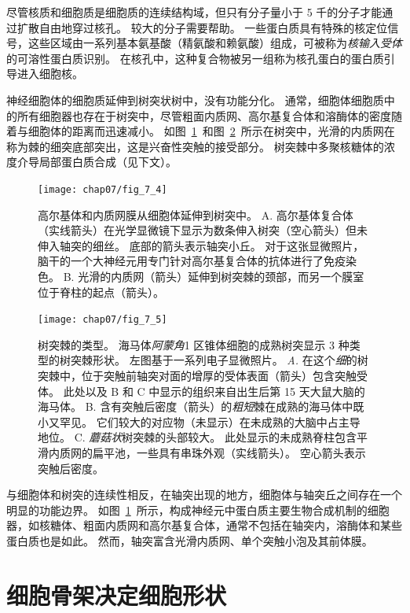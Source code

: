 尽管核质和细胞质是细胞质的连续结构域，但只有分子量小于 5 千的分子才能通过扩散自由地穿过核孔。
较大的分子需要帮助。
一些蛋白质具有特殊的核定位信号，这些区域由一系列基本氨基酸（精氨酸和赖氨酸）组成，可被称为\textit{核输入受体}的可溶性蛋白质识别。
在核孔中，这种复合物被另一组称为核孔蛋白的蛋白质引导进入细胞核。


神经细胞体的细胞质延伸到树突状树中，没有功能分化。 
通常，细胞体细胞质中的所有细胞器也存在于树突中，尽管粗面内质网、高尔基复合体和溶酶体的密度随着与细胞体的距离而迅速减小。 
如图~\ref{fig:7_4}~和图~\ref{fig:7_5}~所示在树突中，光滑的内质网在称为棘的细突底部突出，这是兴奋性突触的接受部分。
树突棘中多聚核糖体的浓度介导局部蛋白质合成（见下文）。


\begin{figure}[htbp]
	\centering
	\texttt{[image: chap07/fig\_7\_4]}
	\caption{高尔基体和内质网膜从细胞体延伸到树突中。
		A. 高尔基体复合体（实线箭头）在光学显微镜下显示为数条伸入树突（空心箭头）但未伸入轴突的细丝。
		底部的箭头表示轴突小丘。
		对于这张显微照片，脑干的一个大神经元用专门针对高尔基复合体的抗体进行了免疫染色\cite{de1986heterogeneous}。
		B. 光滑的内质网（箭头）延伸到树突棘的颈部，而另一个膜室位于脊柱的起点（箭头）\cite{cooney2002endosomal}。}
	\label{fig:7_4}
\end{figure}


\begin{figure}[htbp]
	\centering
	\texttt{[image: chap07/fig\_7\_5]}
	\caption{树突棘的类型。
		海马体\textit{阿蒙角}1 区锥体细胞的成熟树突显示 3 种类型的树突棘形状。
		左图基于一系列电子显微照片\cite{harris1989dendritic,sorra1993occurrence}。
		\textit{A.} 在这个\textit{细}的树突棘中，位于突触前轴突对面的增厚的受体表面（箭头）包含突触受体。
		此处以及 B 和 C 中显示的组织来自出生后第 15 天大鼠大脑的海马体。
		B. 含有突触后密度（箭头）的\textit{粗短}棘在成熟的海马体中既小又罕见。
		它们较大的对应物（未显示）在未成熟的大脑中占主导地位。
		C. \textit{蘑菇状}树突棘的头部较大。
		此处显示的未成熟脊柱包含平滑内质网的扁平池，一些具有串珠外观（实线箭头）。
		空心箭头表示突触后密度。}
	\label{fig:7_5}
\end{figure}


与细胞体和树突的连续性相反，在轴突出现的地方，细胞体与轴突丘之间存在一个明显的功能边界。
如图~\ref{fig:7_4}~所示，构成神经元中蛋白质主要生物合成机制的细胞器，如核糖体、粗面内质网和高尔基复合体，通常不包括在轴突内，溶酶体和某些蛋白质也是如此。
然而，轴突富含光滑内质网、单个突触小泡及其前体膜。



\section{细胞骨架决定细胞形状}

